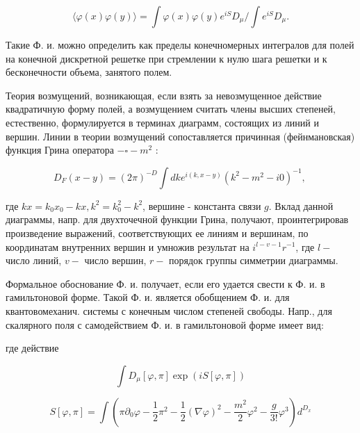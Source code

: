 \documentclass[10pt]{article}
\begin{document}
\[

\langle\varphi(x) \varphi(y)\rangle=\int \varphi(x) \varphi(y) e^{i S} D_{\mu} / \int e^{i S} D_{\mu} .

\]



Такие Ф. и. можно определить как пределы конечномерных интегралов для полей на конечной дискретной решетке при стремлении к нулю шага решетки и к бесконечности объема, занятого полем.



Теория возмущений, возникающая, если взять за невозмущенное действие квадратичную форму полей, а возмущением считать члены высших степеней, естественно, формулируется в терминах диаграмм, состоящих из линий и вершин. Линии в теории возмущений сопоставляется причинная (фейнмановская) функция Грина оператора $-\square-m^{2}$ :



\[

D_{F}(x-y)=(2 \pi)^{-D} \int d k e^{i(k, x-y)}\left(k^{2}-m^{2}-i 0\right)^{-1} \text {, }

\]



где $k x=k_{0} x_{0}-k x, k^{2}=k_{0}^{2}-k^{2}$, вершине - константа связи $g$. Вклад данной диаграммы, напр. для двухточечной функции Грина, получают, проинтегрировав произведение выражений, соответствующих ее линиям и вершинам, по координатам внутренних вершин и умножив результат на $i^{l-v-1} r^{-1}$, где $l-$ число линий, $v-$ число вершин, $r-$ порядок группы симметрии диаграммы.



Формальное обоснование Ф. и. получает, если его удается свести к Ф. и. в гамильтоновой форме. Такой Ф. и. является обобщением Ф. и. для квантовомеханич. системы с конечным числом степеней свободы. Напр., для скалярного поля с самодействием Ф. и. в гамильтоновой форме имеет вид:



где действие



\[

\int D_{\mu}[\varphi, \pi] \exp (i S[\varphi, \pi])

\]



\[

S[\varphi, \pi]=\int\left(\pi \partial_{0} \varphi-\frac{1}{2} \pi^{2}-\frac{1}{2}(\nabla \varphi)^{2}-\frac{m^{2}}{2} \varphi^{2}-\frac{g}{3 !} \varphi^{3}\right) d^{D_{x}}

\]
\end{document}
